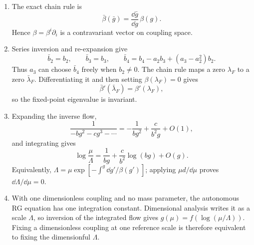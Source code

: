 \begin{enumerate}
  \begin{enumerate}
    \item[(a)] The exact chain rule is
    \[
      \boxed{\bar\beta(\bar g)
        =\frac{\dd\bar g}{\dd g}\,\beta(g).}
    \]
      Hence \(\beta=\beta^i\partial_i\) is a contravariant vector on
      coupling space.
    \item[(b)] Series inversion and re-expansion give
      \[
        \bar b_2=b_2,\qquad \bar b_3=b_3,\qquad
        \bar b_4=b_4-a_2b_3+(a_3-a_2^2)b_2 .
      \]
      Thus \(a_3\) can choose \(\bar b_4\) freely when \(b_2\ne0\).
      The chain rule maps a zero \(\lambda_F\) to a zero
      \(\bar\lambda_F\).  Differentiating it and then setting
      \(\beta(\lambda_F)=0\) gives
      \[
        \bar\beta'(\bar\lambda_F)=\beta'(\lambda_F),
      \]
      so the fixed-point eigenvalue is invariant.
    \item[(c)] Expanding the inverse flow,
      \[
        \frac1{-bg^2-cg^3-\cdots}
          =-\frac1{bg^2}+\frac{c}{b^2g}+O(1),
      \]
      and integrating gives
      \[
        \log\frac{\mu}{\Lambda}
          =\frac1{bg}+\frac{c}{b^2}\log(bg)+O(g).
      \]
      Equivalently,
      \(\Lambda=\mu\exp[-\int^g \dd g'/\beta(g')]\); applying
      \(\mu d/\dd\mu\) proves \(\dd\Lambda/\dd\mu=0\).
    \item[(d)] With one dimensionless coupling and no mass parameter, the
      autonomous RG equation has one integration constant.  Dimensional
      analysis writes it as a scale \(\Lambda\), so inversion of the
      integrated flow gives
      \(g(\mu)=f(\log(\mu/\Lambda))\).  Fixing a dimensionless coupling at
      one reference scale is therefore equivalent to fixing the
      dimensionful \(\Lambda\).
  \end{enumerate}


\end{enumerate}
